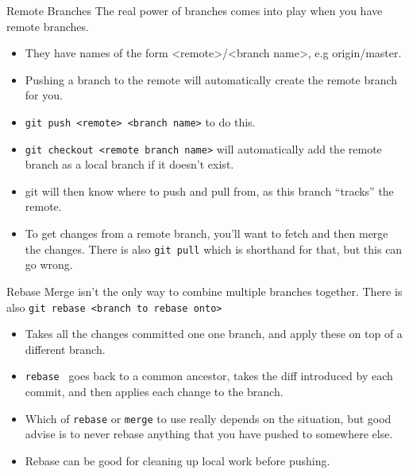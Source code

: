 \documentclass{beamer}
\begin{document}
\begin{frame}{Remote Branches}
    The real power of branches comes into play when you have remote branches.
    \begin{itemize}
        \item They have names of the form <remote>/<branch name>, e.g origin/master.
        \item Pushing a branch to the remote will automatically create the remote branch for you.
        \item \texttt{git push <remote> <branch name>} to do this.
        \item \texttt{git checkout <remote branch name>} will automatically add the remote branch as a local branch if it doesn't exist.
        \item git will then know where to push and pull from, as this branch ``tracks'' the remote.
        \item To get changes from a remote branch, you'll want to fetch and then merge the changes. There is also \texttt{git pull} which is shorthand for that, but this can go wrong.
    \end{itemize}
\end{frame}

\begin{frame}{Rebase}
    Merge isn't the only way to combine multiple branches together. There is also \texttt{git rebase <branch to rebase onto>}
    \begin{itemize}
        \item Takes all the changes committed one one branch, and apply these on top of a different branch.
        \item \texttt{rebase } goes back to a common ancestor, takes the diff introduced by each commit, and then applies each change to the branch.
        \item Which of \texttt{rebase} or \texttt{merge} to use really depends on the situation, but good advise is to never rebase anything that you have pushed to somewhere else.
        \item Rebase can be good for cleaning up local work before pushing.
    \end{itemize}
\end{frame}
\end{document}
